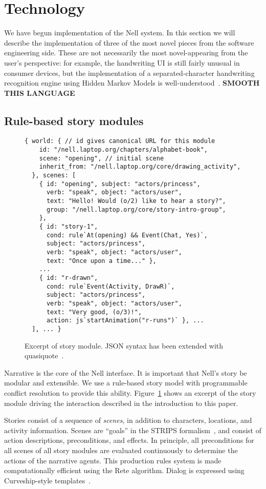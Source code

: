 \documentclass[preprint]{sig-alternate}
\begin{document}
\section{Technology}
We have begun implementation of the Nell system.  In this section we
will describe the implementation of three of the most novel pieces
from the software engineering side.  These are not necessarily the
most novel-appearing from the user's perspective: for example, the
handwriting UI is still fairly unusual in consumer devices, but the
implementation of a separated-character handwriting recognition engine
using Hidden Markov Models is well-understood~\cite{hanshu:handwriting}.
\textbf{SMOOTH THIS LANGUAGE}

\subsection{Rule-based story modules}
\begin{figure}\small
\begin{verbatim}
{ world: { // id gives canonical URL for this module
    id: "/nell.laptop.org/chapters/alphabet-book",
    scene: "opening", // initial scene
    inherit_from: "/nell.laptop.org/core/drawing_activity",
  }, scenes: [
    { id: "opening", subject: "actors/princess",
      verb: "speak", object: "actors/user",
      text: "Hello! Would (o/2) like to hear a story?",
      group: "/nell.laptop.org/core/story-intro-group",
    },
    { id: "story-1",
      cond: rule`At(opening) && Event(Chat, Yes)`,
      subject: "actors/princess",
      verb: "speak", object: "actors/user",
      text: "Once upon a time..." },
    ...
    { id: "r-drawn",
      cond: rule`Event(Activity, DrawR)`,
      subject: "actors/princess",
      verb: "speak", object: "actors/user",
      text: "Very good, (o/3)!",
      action: js`startAnimation("r-runs")` }, ...
  ], ... }
\end{verbatim}
\caption{Excerpt of story module.  JSON syntax has been extended with
quasiquote~\cite{quasiquote}.}\label{fig:rules}
\end{figure}
Narrative is the core of the Nell interface.  It is important that
Nell's story be modular and extensible.  We use a rule-based story
model with programmable conflict resolution to provide this ability.
Figure~\ref{fig:rules} shows an excerpt of the story module driving
the interaction described in the introduction to this paper.

Stories consist of a sequence of \textit{scenes}, in addition to
characters, locations, and activity information.  Scenes are ``goals''
in the STRIPS formalism~\cite{strips}, and consist of
action descriptions, preconditions, and effects.
In principle, all preconditions for all scenes of all story modules
are evaluated continuously to determine the actions of the narrative
agents.  This production rules system
is made computationally efficient using the Rete
algorithm.  Dialog is expressed using Curveship-style
templates~\cite{montfort:curveship}.
\end{document}
